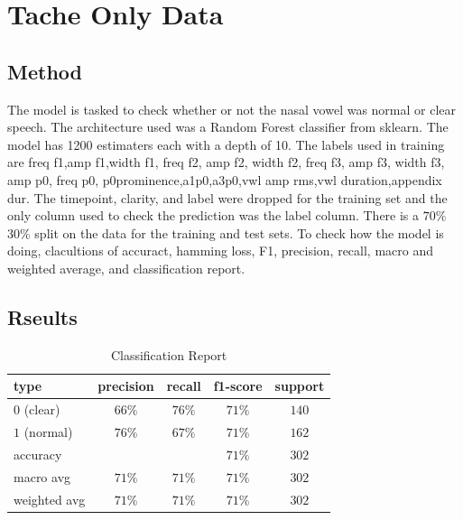 \documentclass[12pt]{article}
\begin{document}
    \singlespacing
    \section*{Tache Only Data}
    \subsection*{Method}
    \indent
    \indent
    The model is tasked to check whether or not the nasal vowel was normal or clear
    speech. The architecture used was a Random Forest classifier from sklearn. The
    model has 1200 estimaters each with a depth of 10. The labels used in training
    are freq f1,amp f1,width f1, freq f2, amp f2, width f2, freq f3, amp f3, width
    f3, amp p0, freq p0, p0prominence,a1p0,a3p0,vwl amp rms,vwl duration,appendix
    dur. The timepoint, clarity, and label were dropped for the training set and the
    only column used to check the prediction was the label column. There is a
    $70\%$ $30\%$ split on the data for the training and test sets. To check how the
    model is doing, clacultions of accuract, hamming loss, F1, precision, recall,
    macro and weighted average, and classification report.
    \subsection*{Rseults}
    \begin{table}[ht!]
        \centering
        \caption{Classification Report}
        \label{table:report}
        \begin{tabular}{|l|c|c|c|c|}
            \hline
            \textbf{type} & \textbf{precision} & \textbf{recall} & \textbf{f1-score} & \textbf{support} \\
            \hline
            \hline
            $0$ (clear)   & $66\%$             & $76\%$          & $71\%$            & $140$            \\
            \hline
            $1$ (normal)  & $76\%$             & $67\%$          & $71\%$            & $162$            \\
            \hline
            accuracy      &                    &                 & $71\%$            & $302$            \\
            \hline
            macro avg     & $71\%$             & $71\%$          & $71\%$            & $302$            \\
            \hline
            weighted avg  & $71\%$             & $71\%$          & $71\%$            & $302$            \\
            \hline
        \end{tabular}
    \end{table}
\end{document}
